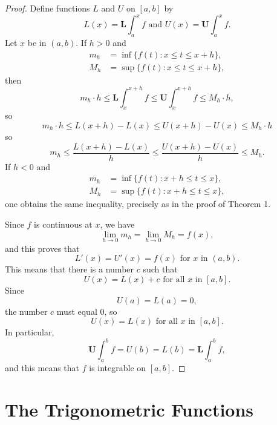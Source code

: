 \documentclass{article}
\numberwithin{corollary}{subsection}
\numberwithin{definition}{subsection}
\numberwithin{lemma}{subsection}
\numberwithin{theorem}{subsection}
\begin{document}
\begin{proof}
  Define functions $L$ and $U$ on $[a, b]$ by \[
    L(x) = \textbf{L}\int_a^x f \text{ and } U(x) = \textbf{U}\int_a^x f.
  \] Let $x$ be in $(a, b)$. If $h > 0$ and
  \begin{align*}
    m_h &= \inf\{f(t): x \leq t \leq x + h\}, \\
    M_h &= \sup\{f(t): x \leq t \leq x + h\},
  \end{align*}
  then \[
    m_h \cdot h \leq \textbf{L}\int_x^{x + h} f \leq \textbf{U}\int_x^{x + h} f
    \leq M_h \cdot h,
  \] so \[
    m_h \cdot h \leq L(x + h) - L(x) \leq U(x + h) - U(x) \leq M_h \cdot h
  \] so \[
    m_h \leq \frac{L(x + h) - L(x)}{h} \leq \frac{U(x + h) - U(x)}{h} \leq M_h.
  \] If $h < 0$ and
  \begin{align*}
    m_h &= \inf\{f(t): x + h \leq t \leq x\}, \\
    M_h &= \sup\{f(t): x + h \leq t \leq x\},
  \end{align*}
  one obtains the same inequality, precisely as in the proof of
  Theorem 1.

  Since $f$ is continuous at $x$, we have \[
    \lim_{h \to 0} m_h = \lim_{h \to 0} M_h = f(x),
  \] and this proves that \[
    L'(x) = U'(x) = f(x) \text{ for } x \text{ in } (a, b).
  \] This means that there is a number $c$ such that \[
    U(x) = L(x) + c \text{ for all } x \text{ in } [a, b].
  \] Since \[
    U(a) = L(a) = 0,
  \] the number $c$ must equal 0, so \[
    U(x) = L(x) \text{ for all } x \text{ in } [a, b].
  \] In particular, \[
    \textbf{U}\int_a^b f = U(b) = L(b) = \textbf{L}\int_a^b f,
  \] and this means that $f$ is integrable on $[a, b]$.
\end{proof}

\section{The Trigonometric Functions}
\end{document}
